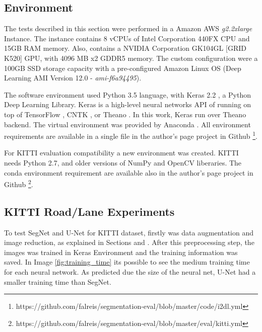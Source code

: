 \documentclass[10pt,twocolumn,letterpaper]{article}
\begin{document}
\subsection{Environment} \label{ssec:environment}

The tests described in this section were performed in a Amazon AWS \cite{AMAZON_WEBSITE} \textit{g2.2xlarge} Instance. The instance contains 8 vCPUs of Intel Corporation 440FX CPU and 15GB RAM memory. Also, contains a NVIDIA Corporation GK104GL [GRID K520] GPU, with 4096 MB x2 GDDR5 memory. The custom configuration were a 100GB SSD storage capacity with a pre-configured Amazon Linux OS (Deep Learning AMI Version 12.0 - \textit{ami-f6a94495}).

The software environment used Python 3.5 \cite{PYTHON_WEBSITE} language, with Keras 2.2 \cite{KERAS}, a Python Deep Learning Library. Keras is a high-level neural networks API of running on top of TensorFlow \cite{TENSORFLOW}, CNTK \cite{CNTK}, or Theano \cite{THEANO} \cite{KERAS}. In this work, Keras run over Theano \cite{THEANO} backend. The virtual environment was provided by Anaconda \cite{ANACONDA_WEBSITE}. All environment requirements are available in a single file in the author's page project in Github \footnote{https://github.com/falreis/segmentation-eval/blob/master/code/i2dl.yml}.

For KITTI evaluation compatibility a new environment was created. KITTI needs Python 2.7, and older versions of NumPy and OpenCV liberaries. The conda environment requirement are available also in the author's page project in Github \footnote{https://github.com/falreis/segmentation-eval/blob/master/eval/kitti.yml}.

\subsection{KITTI Road/Lane Experiments} \label{ssec:kitti_experiments}

To test SegNet and U-Net for KITTI dataset, firstly was data augmentation and image reduction, as explained in Sections \label{ssec:data_augmentation} and \label{ssec:image_reduction}. After this preprocessing step, the images was trained in Keras Environment and the training information was saved. In Image \ref{fig:training_time} its possible to see the medium training time for each neural network. As predicted due the size of the neural net, U-Net had a smaller training time than SegNet.
\end{document}
